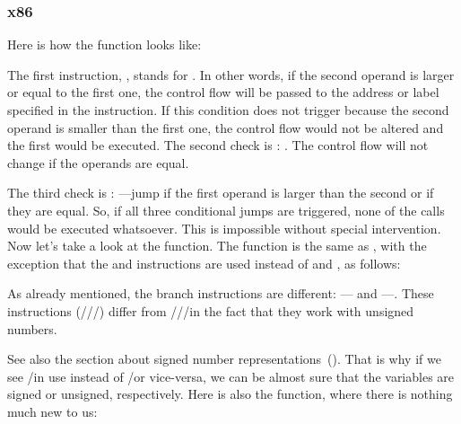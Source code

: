 \subsubsection{x86}


Here is how the  function looks like:




The first instruction, \JLE, stands for . 
In other words, if the second operand is 
larger or equal to the first one, the control flow will be passed to the address or label specified in the instruction.
If this condition does not trigger because the second operand is smaller than the first one, the control flow would not be altered and the first \printf would be executed.
The second check is \JNE: .
The control flow will not change if the operands are equal.

The third check is \JGE: ---jump if the first operand is larger than 
the second or if they are equal.
So, if all three conditional jumps are triggered, none of the \printf calls would be executed whatsoever. 
This is impossible without special intervention.
Now let's take a look at the  function.
The  function is the same as , with the exception that the \JBE and \JAE instructions
are used instead of \JLE and \JGE, as follows:




As already mentioned, the branch instructions are different:
\JBE--- and \JAE---.
These instructions (\JA/\JAE/\JB/\JBE) differ from \JG/\JGE/\JL/\JLE in the fact that they work with unsigned numbers.


See also the section about signed number representations~().
That is why if we see \JG/\JL in use instead of \JA/\JB or vice-versa, 
we can be almost sure that the variables are signed or unsigned, respectively.
Here is also the \main function, where there is nothing much new to us:

